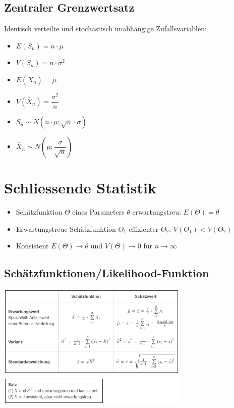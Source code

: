 \documentclass[8pt,a4paper]{scrartcl}
\begin{document}
\begin{multicols*}{3}
			\subsection{Zentraler Grenzwertsatz}
			 Identisch verteilte und stochastisch unabhängige Zufallsvariablen:
			 \begin{itemize}\itemsep0pt				
					\item $E(S_{n})=n\cdot \mu$
					\item $V(S_{n})=n\cdot \sigma^{2}$
					\item $E(\bar{X}_{n})=\mu$
					\item $V(\bar{X}_{n})=\dfrac{\sigma^{2}}{n}$
					\item $S_{n} \sim N(n\cdot \mu ;\sqrt{n}\cdot \sigma )$
					\item $\bar{X}_{n}  \sim N(\mu ; \dfrac{\sigma}{\sqrt{n}} )$
				\end{itemize}	
				
			\section{Schliessende Statistik}
			
			 	\begin{itemize}\itemsep0pt				
					\item Schätzfunktion $\Theta$ eines Parameters $\theta$ erwartungstreu: $E(\Theta)=\theta $
					\item Erwartungstreue Schätzfunktion $\Theta_{1}$ effizienter $\Theta_{2}$: $ V(\Theta_{1})<V(\Theta_{2})$
					\item Konsistent $E(\Theta)\rightarrow\theta$ und $V(\Theta)\rightarrow 0$ für $n\rightarrow \infty$
				\end{itemize}	
				\subsection{Schätzfunktionen/Likelihood-Funktion}
					\includegraphics[height=6cm]{img/schaetz1.png} 
					

\end{multicols*}
\end{document}
